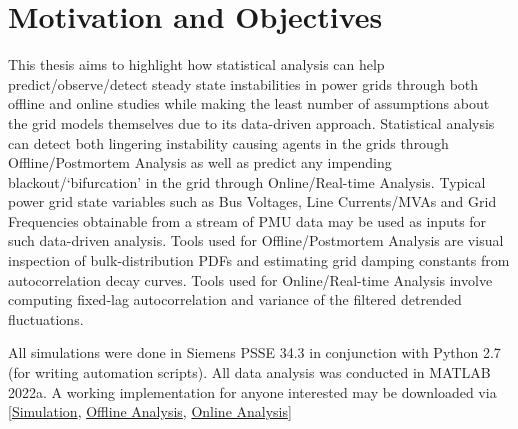 \section[Motivation and Objectives]{Motivation and Objectives}
\label{sec:obj}

This thesis aims to highlight how statistical analysis can help predict/observe/detect steady state instabilities in power grids through both offline and online studies while making the least number of assumptions about the grid models themselves due to its data-driven approach. Statistical analysis can detect both lingering instability causing agents in the grids through Offline/Postmortem Analysis as well as predict any impending blackout/`bifurcation' in the grid through Online/Real-time Analysis. Typical power grid state variables such as Bus Voltages, Line Currents/MVAs and Grid Frequencies obtainable from a stream of PMU data may be used as inputs for such data-driven analysis. Tools used for Offline/Postmortem Analysis are visual inspection of bulk-distribution PDFs and estimating grid damping constants from autocorrelation decay curves. Tools used for Online/Real-time Analysis involve computing fixed-lag autocorrelation and variance of the filtered detrended fluctuations.

All simulations were done in Siemens PSSE 34.3 in conjunction with Python 2.7 (for writing automation scripts). All data analysis was conducted in MATLAB 2022a. A working implementation for anyone interested may be downloaded via [\href{https://t.ly/HwAT}{Simulation}, \href{https://t.ly/e1f9}{Offline Analysis}, \href{https://t.ly/u_Mp}{Online Analysis}]